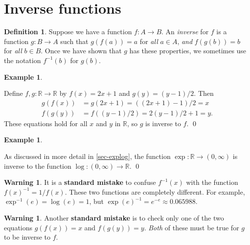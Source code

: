 \documentclass[a4paper]{book}
\newcommand{\RED}[1]{{\color{red}#1}}
\newcommand{\PURPLE}[1]{{\color{purple}#1}}
\newcommand{\R}         {{\mathbb{R}}}
\newcommand{\xra}       {\xrightarrow}
\renewcommand{\:}{\colon}
\newcommand{\bilabel}[1]{\hypertarget{#1}{\label{#1}}}
\newcommand{\EMPH}[1]{\RED{\emph{#1}}}
\newcommand{\DEFN}[1]{\PURPLE{\emph{#1}}}
\theoremstyle{definition}
\newtheorem{warning}[theorem]{Warning}
\newtheorem{definition}[theorem]{Definition}
\newtheorem{example}[theorem]{Example}
\begin{document}
\section{Inverse functions}
\label{sec-func-inv}

\begin{definition}
 Suppose we have a function $f\:A\xra{}B$.  An \DEFN{inverse} for $f$
 is a function $g\:B\xra{}A$ such that $g(f(a))=a$ for \EMPH{all}
 $a\in A$, \EMPH{and} $f(g(b))=b$ for \EMPH{all} $b\in B$.  Once we
 have shown that $g$ has these properties, we sometimes use the
 notation \DEFN{$f^{-1}(b)$} for $g(b)$.
\end{definition}
\begin{example}\bilabel{eg-affine-inverse}
 Define $f,g\:\R\xra{}\R$ by $f(x)=2x+1$ and $g(y)=(y-1)/2$.  Then
 \begin{align*}
  g(f(x)) &= g(2x+1) = ((2x+1)-1)/2 = x \\
  f(g(y)) &= f((y-1)/2) = 2(y-1)/2 + 1 = y.
 \end{align*}
 These equations hold for all $x$ and $y$ in $\R$, so $g$ is inverse
 to $f$. \qed
\end{example}
\begin{example}\bilabel{eg-exp-inv}
 As discussed in more detail in \autoref{sec-explog}, the function
 $\exp\:\R\xra{}(0,\infty)$ is inverse to the function
 $\log\:(0,\infty)\xra{}\R$.  \qed
\end{example}
\begin{warning}
 It is a \RED{\textbf{standard mistake}} to confuse $f^{-1}(x)$ with
 the function $f(x)^{-1}=1/f(x)$.  These two functions are completely
 different.  For example, $\exp^{-1}(e)=\log(e)=1$, but
 $\exp(e)^{-1}=e^{-e}\approx 0.065988$.
\end{warning}
\begin{warning}
 Another \RED{\textbf{standard mistake}} is to check only one of the
 two equations $g(f(x))=x$ and $f(g(y))=y$.  \EMPH{Both} of these must
 be true for $g$ to be inverse to $f$.
\end{warning}
\end{document}
